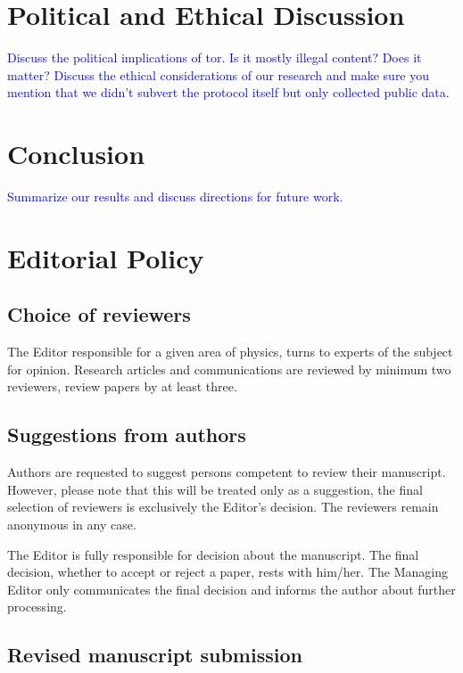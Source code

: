 \documentclass[USenglish,oneside,twocolumn]{article}
\newcommand\CONTENT[1]{\textcolor{blue}{#1}}
\begin{document}
\section{Political and Ethical Discussion}

\CONTENT{Discuss the political implications of tor. Is it mostly illegal content? Does it matter? Discuss the ethical considerations of our research and make sure you mention that we didn’t subvert the protocol itself but only collected public data.}

\section{Conclusion}

\CONTENT{Summarize our results and discuss directions for future work.}

\section{Editorial Policy}

\subsection{Choice of reviewers}

The Editor responsible for a given area of physics, turns to experts of the subject for opinion. Research articles and communications are reviewed by minimum two reviewers, review papers by at least three.

\subsection{Suggestions from authors}

Authors are requested to suggest persons competent to review their manuscript. However, please note that this will be treated only as a suggestion, the final selection of reviewers is exclusively the Editor's decision. The reviewers remain anonymous in any case.

The Editor is fully responsible for decision about the manuscript. The final decision, whether to accept or reject a paper, rests with him/her. The Managing Editor only communicates the final decision and informs the author about further processing.

\subsection{Revised manuscript submission}
\end{document}
